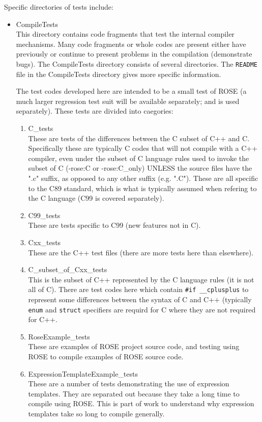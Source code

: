 Specific directories of tests include:
\begin{itemize}

   \item CompileTests \\
   This directory contains code fragments that test the internal compiler mechanisms.
Many code fragments or whole codes are present either have previously or continue to present
problems in the compilation (demonstrate bugs).  The CompileTests directory consists of several directories.
The {\tt README} file in the CompileTests directory gives more specific information.

The test codes developed here are intended to be a small test of ROSE (a much larger
regression test suit will be available separately; and is used separately).
These tests are divided into caegories:
\begin{enumerate}
   \item C\_tests \\
      These are tests of the differences between the C subset of C++ and C. Specifically
      these are typically C codes that will not compile with a C++ compiler, even under the
      subset of C language rules used to invoke the subset of C (-rose:C or -rose:C\_only)
      UNLESS the source files have the ".c" suffix, as opposed to any other suffix
      (e.g. ".C"). These are all specific to the C89 standard, which is what is typically
      assumed when refering to the C language (C99 is covered separately).
   \item C99\_tests \\
      These are tests specific to C99 (new features not in C).
   \item Cxx\_tests \\
      These are the C++ test files (there are more tests here than elsewhere).
   \item C\_subset\_of\_Cxx\_tests \\
      This is the subset of C++ represented by the C language rules (it is not all of C).
      There are test codes here which contain {\tt \#if \_\_cplusplus} to represent some
      differences between the syntax of C and C++ (typically {\tt enum} and {\tt struct}
      specifiers are requird for C where they are not required for C++.
   \item RoseExample\_tests \\
      These are examples of ROSE project source code, and testing using ROSE to compile
    examples of ROSE source code.
   \item ExpressionTemplateExample\_tests \\
      These are a number of tests demonstrating the use of expression templates.
      They are separated out because they take a long time to compile using ROSE.
      This is part of work to understand why expression templates take so long
      to compile generally.
\end{enumerate}


\end{itemize}
